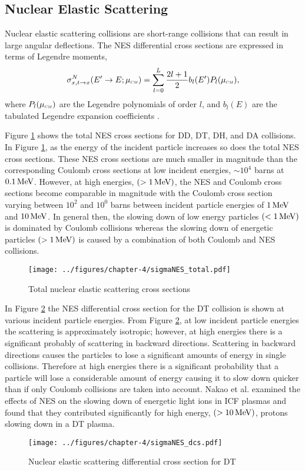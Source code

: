 \subsection{Nuclear Elastic Scattering}
Nuclear elastic scattering collisions are short-range collisions that can result in large angular deflections. The NES differential cross sections are expressed in terms of Legendre moments,
\begin{equation} \label{eqn:nes_differential cross section}
    \sigma_{x,t \rightarrow x}^N(E^{\prime} \rightarrow E; \mucm) = \sum_{l=0}^L \dfrac{2l+1}{2} b_l(E^{\prime}) P_l(\mucm),
\end{equation}
where $P_l(\mucm)$ are the Legendre polynomials of order $l$, and $b_l(E)$ are the tabulated Legendre expansion coefficients \cite{Brown-2018}.

Figure \ref{fig:nesTotal} shows the total NES cross sections for DD, DT, DH, and DA collisions. In Figure \ref{fig:nesTotal}, as the energy of the incident particle increases so does the total NES cross sections. These NES cross sections are much smaller in magnitude than the corresponding Coulomb cross sections at low incident energies, $\sim 10^4$ barns at $0.1 \,\text{MeV}$. However, at high energies, $(> 1 \,\text{MeV})$, the NES and Coulomb cross sections become comparable in magnitude with the Coulomb cross section varying between $10^2$ and $10^0$ barns between incident particle energies of $1 \,\text{MeV}$ and $10 \,\text{MeV}$. In general then, the slowing down of low energy particles $(< 1 \,\text{MeV})$ is dominated by Coulomb collisions whereas the slowing down of energetic particles $(> 1 \,\text{MeV})$ is caused by a combination of both Coulomb and NES collisions.

\begin{figure}[!htb]
    \centering
    \texttt{[image: ../figures/chapter-4/sigmaNES\_total.pdf]}
    \caption{Total nuclear elastic scattering cross sections}
    \label{fig:nesTotal}
\end{figure}

In Figure \ref{fig:nesDCS} the NES differential cross section for the DT collision is shown at various incident particle energies. From Figure \ref{fig:nesDCS}, at low incident particle energies the scattering is approximately isotropic; however, at high energies there is a significant probably of scattering in backward directions. Scattering in backward directions causes the particles to lose a significant amounts of energy in single collisions. Therefore at high energies there is a significant probability that a particle will lose a considerable amount of energy causing it to slow down quicker than if only Coulomb collisions are taken into account. Nakao et al. \cite{Nakao-1990} examined the effects of NES on the slowing down of energetic light ions in ICF plasmas and found that they contributed significantly for high energy, $(> 10 \,\text{MeV})$, protons slowing down in a DT plasma.

\begin{figure}[!htb]
    \centering
    \texttt{[image: ../figures/chapter-4/sigmaNES\_dcs.pdf]}
    \caption{Nuclear elastic scattering differential cross section for DT}
    \label{fig:nesDCS}
\end{figure}